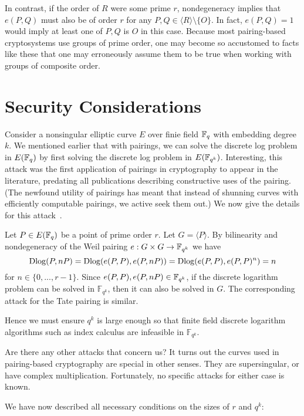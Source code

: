 In contrast, if the order of $R$ were some prime $r$, nondegeneracy implies
that $e(P, Q)$ must also be of order $r$ for any
$P, Q \in \langle R \rangle \setminus \{ O \}$.
In fact, $e(P, Q) = 1$ would imply at least one of $P, Q$ is $O$ in this case.
Because most pairing-based cryptosystems use groups of prime order,
one may become so accustomed to facts like these that one may erroneously
assume them to be true when working with groups of composite order.

\section {Security Considerations}

Consider a nonsingular elliptic curve $E$ over finie field $\mathbb{F}_q$ with
embedding degree $k$.
We mentioned earlier that with pairings,
we can solve the discrete log problem in
$E(\mathbb{F}_q)$ by first solving the discrete log problem in $E(\mathbb{F}_{q^k})$.
Interesting, this attack was the first application of pairings
in cryptography to appear in the literature,
predating all publications describing
constructive uses of the pairing.
(The newfound utility
of pairings has meant that instead of shunning curves with efficiently
computable pairings, we active seek them out.)
We now give the details for this attack~\cite{mov,fr}.

Let $P \in E(\mathbb{F}_q)$ be a point of prime order $r$.
Let $G = \langle P \rangle$.
By bilinearity and nondegeneracy of the Weil pairing
$e : G \times G \rightarrow \mathbb{F}_{q^k}$ we have
\[ \mathop{\rm Dlog} (P, nP) = \mathop{\rm Dlog} ( e(P,P), e(P, nP) )
= \mathop{\rm Dlog} (e(P,P),e(P,P)^n) = n \]
for $n \in \{0,...,r-1\}$.
Since $e(P,P), e(P, nP) \in \mathbb{F}_{q^k}$,
if the discrete logarithm problem can be solved
in $\mathbb{F}_{q^k}$, then it can also be solved in $G$. The corresponding
attack for the Tate pairing is similar.

Hence we must ensure $q^k$ is large enough so that
finite field discrete logarithm algorithms such as index calculus are
infeasible in $\mathbb{F}_{q^k}$.

Are there any other attacks that concern us? It turns out
the curves used in pairing-based cryptography are special in other senses.
They are supersingular, or have complex multiplication.
Fortunately, no specific attacks for either case is known.

We have now described all necessary conditions on the sizes of
$r$ and $q^k$:

